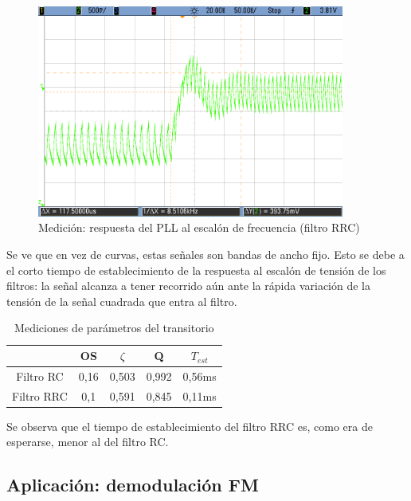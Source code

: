 \begin{figure}[H]
    \centering
    \includegraphics[width=0.9\textwidth]{../Ex2/resources/escalonrrc.png}
    \caption{Medición: respuesta del PLL al escalón de frecuencia (filtro RRC)}
    \label{escalonrrc}
\end{figure}

Se ve que en vez de curvas, estas señales son bandas de ancho fijo. Esto se debe a el corto tiempo de establecimiento de la respuesta al escalón de tensión de los filtros: la señal alcanza a tener recorrido aún ante la rápida variación de la tensión de la señal cuadrada que entra al filtro. 

\begin{table}[H]
    \centering
    \begin{tabular}{|c|c|c|c|c|}
    \hline
                &  OS   &   $\zeta$  & Q    &   $T_{est}$   \tabularnewline
    \hline
    \hline
    
    Filtro RC  &    0,16     &     0,503    &          0,992 & 0,56ms  \tabularnewline 
    \hline
    Filtro RRC &    0,1     &   0,591    &     0,845  & 0,11ms    \tabularnewline
    \hline
    \end{tabular}
    \caption{Mediciones de parámetros del transitorio}
    \label{tablacaptura}
\end{table}

Se observa que el tiempo de establecimiento del filtro RRC es, como era de esperarse, menor al del filtro RC. 


\subsection{Aplicación: demodulación FM}
